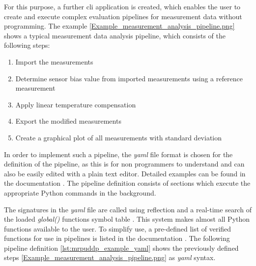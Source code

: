 For this purpose, a further \gls{cli} application is created, which
enables the user to create and execute complex evaluation pipelines for
measurement data without programming. The example
\ref{Example_measurement_analysis_pipeline.png} shows a typical
measurement data analysis pipeline, which consists of the following
steps:

\begin{enumerate}
\def\labelenumi{\arabic{enumi}.}
\tightlist
\item
  Import the measurements
\item
  Determine sensor bias value from imported measurements using a
  reference measurement
\item
  Apply linear temperature compensation
\item
  Export the modified measurements
\item
  Create a graphical plot of all measurements with standard deviation
\end{enumerate}

In order to implement such a pipeline, the \emph{yaml} file format is
chosen for the definition of the pipeline, as this is for non
programmers to understand and can also be easily edited with a plain
text editor. Detailed examples can be found in the documentation
\cite{MagneticReadoutProcessingReadTheDocs}. The pipeline definition
consists of sections which execute the appropriate Python commands in
the background.

The signatures in the \emph{yaml} file are called using reflection and a
real-time search of the loaded \emph{global()} functions symbol table
\cite{PythonGlobalSymbolTable}. This system makes almost all Python
functions available to the user. To simplify use, a pre-defined list of
verified functions for use in pipelines is listed in the documentation
\cite{MagneticReadoutProcessingReadTheDocs}. The following pipeline
definition \ref{lst:mrpuddp_example_yaml} shows the previously defined
steps \ref{Example_measurement_analysis_pipeline.png} as \emph{yaml}
syntax.

